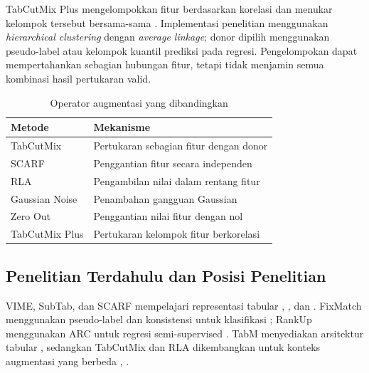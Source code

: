 TabCutMix Plus mengelompokkan fitur berdasarkan korelasi dan menukar kelompok tersebut bersama-sama \cite{ref12}. Implementasi penelitian menggunakan \textit{hierarchical clustering} dengan \textit{average linkage}; donor dipilih menggunakan pseudo-label atau kelompok kuantil prediksi pada regresi. Pengelompokan dapat mempertahankan sebagian hubungan fitur, tetapi tidak menjamin semua kombinasi hasil pertukaran valid.

\begin{table}[!t]
\caption{Operator augmentasi yang dibandingkan}
\label{tab:iii}
\centering
\footnotesize
\setlength{\tabcolsep}{3pt}
\renewcommand{\arraystretch}{1.1}
\begin{tabularx}{\columnwidth}{p{}X}
\hline
\textbf{Metode} & \textbf{Mekanisme} \\
\hline
TabCutMix & Pertukaran sebagian fitur dengan donor \cite{ref12} \\
SCARF & Penggantian fitur secara independen \cite{ref7} \\
RLA & Pengambilan nilai dalam rentang fitur \cite{ref13} \\
Gaussian Noise & Penambahan gangguan Gaussian \\
Zero Out & Penggantian nilai fitur dengan nol \\
TabCutMix Plus & Pertukaran kelompok fitur berkorelasi \cite{ref12} \\
\hline
\end{tabularx}
\end{table}

\subsection{Penelitian Terdahulu dan Posisi Penelitian}

VIME, SubTab, dan SCARF mempelajari representasi tabular \cite{ref5}, \cite{ref6}, dan \cite{ref7}. FixMatch menggunakan pseudo-label dan konsistensi untuk klasifikasi \cite{ref9}; RankUp menggunakan ARC untuk regresi semi-supervised \cite{ref10}. TabM menyediakan arsitektur tabular \cite{ref11}, sedangkan TabCutMix dan RLA dikembangkan untuk konteks augmentasi yang berbeda \cite{ref12}, \cite{ref13}.

